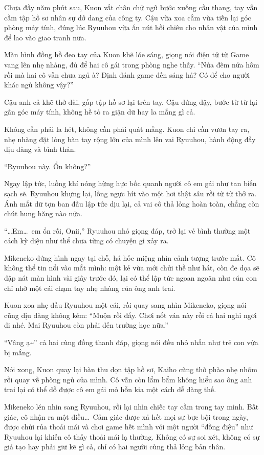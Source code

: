 ﻿\documentclass[../main.tex]{subfiles}
\begin{document}
Chưa đầy năm phút sau, Kuon vắt chân chữ ngũ bước xuống cầu thang, tay vẫn cầm tập hồ sơ nhân sự dở dang của công ty. Cậu vừa xoa cằm vừa tiến lại góc phòng máy tính, đúng lúc Ryuuhou vừa ấn nút hồi chiêu cho nhân vật của mình để lao vào giao tranh nữa.

Màn hình đồng hồ đeo tay của Kuon khẽ lóe sáng, giọng nói điện tử từ Game vang lên nhẹ nhàng, đủ để hai cô gái trong phòng nghe thấy. ``Nửa đêm nửa hôm rồi mà hai cô vẫn chưa ngủ à? Định đánh game đến sáng hả? Có để cho người khác ngủ không vậy?''

Cậu anh cả khẽ thở dài, gấp tập hồ sơ lại trên tay. Cậu đứng dậy, bước từ từ lại gần góc máy tính, không hề tỏ ra giận dữ hay la mắng gì cả.

Không cần phải la hét, không cần phải quát mắng. Kuon chỉ cần vươn tay ra, nhẹ nhàng đặt lòng bàn tay rộng lớn của mình lên vai Ryuuhou, hành động đầy dịu dàng và bình thản.

``Ryuuhou này. Ổn không?''

Ngay lập tức, luồng khí nóng hừng hực bốc quanh người cô em gái như tan biến sạch sẽ. Ryuuhou khựng lại, lồng ngực hít vào một hơi thật sâu rồi từ từ thở ra. Ánh mắt dữ tợn ban đầu lập tức dịu lại, cả vai cô thả lỏng hoàn toàn, chẳng còn chút hung hăng nào nữa.

``\dots Em\dots\ em ổn rồi, Onii,'' Ryuuhou nhỏ giọng đáp, trở lại vẻ bình thường một cách kỳ diệu như thể chưa từng có chuyện gì xảy ra.

Mikeneko đứng hình ngay tại chỗ, há hốc miệng nhìn cảnh tượng trước mắt. Cô không thể tin nổi vào mắt mình: một kẻ vừa mới chửi thề như hát, còn đe dọa sẽ đập nát màn hình vài giây trước đó, lại có thể lập tức ngoan ngoãn như cún con chỉ nhờ một cái chạm tay nhẹ nhàng của ông anh trai.

Kuon xoa nhẹ đầu Ryuuhou một cái, rồi quay sang nhìn Mikeneko, giọng nói cũng dịu dàng không kém: ``Muộn rồi đấy. Chơi nốt ván này rồi cả hai nghỉ ngơi đi nhé. Mai Ryuuhou còn phải đến trường học nữa.''

``Vâng ạ\~{}'' cả hai cùng đồng thanh đáp, giọng nói đều nhỏ nhắn như trẻ con vừa bị mắng.

Nói xong, Kuon quay lại bàn thu dọn tập hồ sơ, Kaiho cũng thở phào nhẹ nhõm rồi quay về phòng ngủ của mình. Cô vẫn còn lẩm bẩm không hiểu sao ông anh trai lại có thể dỗ được cô em gái mỏ hỗn kia một cách dễ dàng thế.

Mikeneko lén nhìn sang Ryuuhou, rồi lại nhìn chiếc tay cầm trong tay mình. Bất giác, cô nhận ra một điều\dots\ Cảm giác được xả hết mọi sự bực bội trong ngày, được chửi rủa thoải mái và chơi game hết mình với một người ``đồng điệu'' như Ryuuhou lại khiến cô thấy thoải mái lạ thường. Không có sự soi xét, không có sự giả tạo hay phải giữ kẽ gì cả, chỉ có hai người cùng thả lỏng bản thân.
\end{document}
